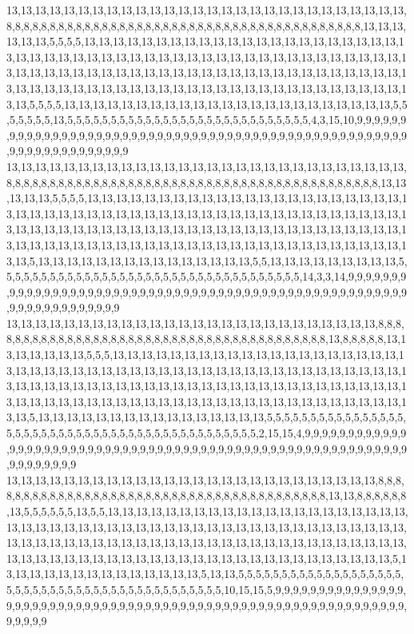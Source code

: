 13,13,13,13,13,13,13,13,13,13,13,13,13,13,13,13,13,13,13,13,13,13,13,13,13,13,13,13,8,8,8,8,8,8,8,8,8,8,8,8,8,8,8,8,8,8,8,8,8,8,8,8,8,8,8,8,8,8,8,8,8,8,8,8,8,8,8,8,8,13,13,13,13,13,13,5,5,5,5,13,13,13,13,13,13,13,13,13,13,13,13,13,13,13,13,13,13,13,13,13,13,13,13,13,13,13,13,13,13,13,13,13,13,13,13,13,13,13,13,13,13,13,13,13,13,13,13,13,13,13,13,13,13,13,13,13,13,13,13,13,13,13,13,13,13,13,13,13,13,13,13,13,13,13,13,13,13,13,13,13,13,13,13,13,13,13,13,13,13,13,13,13,13,13,13,13,13,13,13,13,13,13,13,13,13,13,13,5,5,5,5,13,13,13,13,13,13,13,13,13,13,13,13,13,13,13,13,13,13,13,13,13,13,13,5,5,5,5,5,5,5,13,5,5,5,5,5,5,5,5,5,5,5,5,5,5,5,5,5,5,5,5,5,5,5,5,5,5,5,5,4,3,15,10,9,9,9,9,9,9,9,9,9,9,9,9,9,9,9,9,9,9,9,9,9,9,9,9,9,9,9,9,9,9,9,9,9,9,9,9,9,9,9,9,9,9,9,9,9,9,9,9,9,9,9,9,9,9,9,9,9,9,9,9,9,9,9,9,9,9
13,13,13,13,13,13,13,13,13,13,13,13,13,13,13,13,13,13,13,13,13,13,13,13,13,13,13,13,8,8,8,8,8,8,8,8,8,8,8,8,8,8,8,8,8,8,8,8,8,8,8,8,8,8,8,8,8,8,8,8,8,8,8,8,8,8,8,8,8,8,8,13,13,13,13,13,5,5,5,5,13,13,13,13,13,13,13,13,13,13,13,13,13,13,13,13,13,13,13,13,13,13,13,13,13,13,13,13,13,13,13,13,13,13,13,13,13,13,13,13,13,13,13,13,13,13,13,13,13,13,13,13,13,13,13,13,13,13,13,13,13,13,13,13,13,13,13,13,13,13,13,13,13,13,13,13,13,13,13,13,13,13,13,13,13,13,13,13,13,13,13,13,13,13,13,13,13,13,13,13,13,13,13,13,13,13,13,13,5,13,13,13,13,13,13,13,13,13,13,13,13,13,13,13,5,5,13,13,13,13,13,13,13,13,13,5,5,5,5,5,5,5,5,5,5,5,5,5,5,5,5,5,5,5,5,5,5,5,5,5,5,5,5,5,5,5,5,5,5,5,14,3,3,14,9,9,9,9,9,9,9,9,9,9,9,9,9,9,9,9,9,9,9,9,9,9,9,9,9,9,9,9,9,9,9,9,9,9,9,9,9,9,9,9,9,9,9,9,9,9,9,9,9,9,9,9,9,9,9,9,9,9,9,9,9,9,9,9,9,9
13,13,13,13,13,13,13,13,13,13,13,13,13,13,13,13,13,13,13,13,13,13,13,13,13,13,8,8,8,8,8,8,8,8,8,8,8,8,8,8,8,8,8,8,8,8,8,8,8,8,8,8,8,8,8,8,8,8,8,8,8,8,8,8,8,8,13,8,8,8,8,8,13,13,13,13,13,13,13,5,5,5,13,13,13,13,13,13,13,13,13,13,13,13,13,13,13,13,13,13,13,13,13,13,13,13,13,13,13,13,13,13,13,13,13,13,13,13,13,13,13,13,13,13,13,13,13,13,13,13,13,13,13,13,13,13,13,13,13,13,13,13,13,13,13,13,13,13,13,13,13,13,13,13,13,13,13,13,13,13,13,13,13,13,13,13,13,13,13,13,13,13,13,13,13,13,13,13,13,13,13,13,13,13,13,13,13,13,5,13,13,13,13,13,13,13,13,13,13,13,13,13,13,13,13,5,5,5,5,5,5,5,5,5,5,5,5,5,5,5,5,5,5,5,5,5,5,5,5,5,5,5,5,5,5,5,5,5,5,5,5,5,5,5,5,5,5,5,5,5,2,15,15,4,9,9,9,9,9,9,9,9,9,9,9,9,9,9,9,9,9,9,9,9,9,9,9,9,9,9,9,9,9,9,9,9,9,9,9,9,9,9,9,9,9,9,9,9,9,9,9,9,9,9,9,9,9,9,9,9,9,9,9,9,9,9,9,9,9,9
13,13,13,13,13,13,13,13,13,13,13,13,13,13,13,13,13,13,13,13,13,13,13,13,13,13,8,8,8,8,8,8,8,8,8,8,8,8,8,8,8,8,8,8,8,8,8,8,8,8,8,8,8,8,8,8,8,8,8,8,8,8,8,8,8,8,13,13,8,8,8,8,8,8,13,5,5,5,5,5,5,13,5,5,13,13,13,13,13,13,13,13,13,13,13,13,13,13,13,13,13,13,13,13,13,13,13,13,13,13,13,13,13,13,13,13,13,13,13,13,13,13,13,13,13,13,13,13,13,13,13,13,13,13,13,13,13,13,13,13,13,13,13,13,13,13,13,13,13,13,13,13,13,13,13,13,13,13,13,13,13,13,13,13,13,13,13,13,13,13,13,13,13,13,13,13,13,13,13,13,13,13,13,13,13,13,13,13,5,13,13,13,13,13,13,13,13,13,13,13,13,13,13,5,13,13,5,5,5,5,5,5,5,5,5,5,5,5,5,5,5,5,5,5,5,5,5,5,5,5,5,5,5,5,5,5,5,5,5,5,5,5,5,5,5,5,5,5,5,5,10,15,15,5,9,9,9,9,9,9,9,9,9,9,9,9,9,9,9,9,9,9,9,9,9,9,9,9,9,9,9,9,9,9,9,9,9,9,9,9,9,9,9,9,9,9,9,9,9,9,9,9,9,9,9,9,9,9,9,9,9,9,9,9,9,9,9,9,9,9
